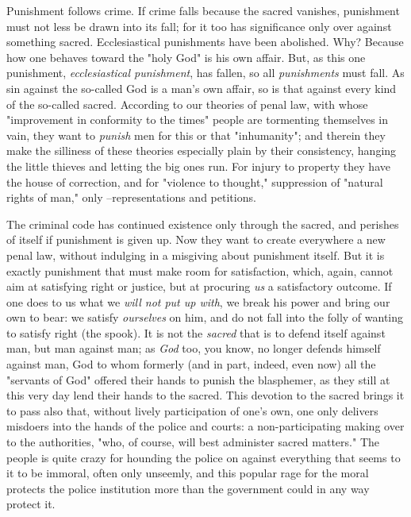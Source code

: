 \documentclass[a4paper]{book}
\begin{document}
Punishment follows crime. If crime falls because the sacred vanishes, 
punishment must not less be drawn into its fall; for it too has significance 
only over against something sacred. Ecclesiastical punishments have been 
abolished. Why? Because how one behaves toward the "{}holy God"{} is his own 
affair. But, as this one punishment, \textit{ecclesiastical punishment}, has 
fallen, so all \textit{punishments} must fall. As sin against the so-called 
God is a man's own affair, so is that against every kind of the so-called 
sacred. According to our theories of penal law, with whose "{}improvement in 
conformity to the times"{} people are tormenting themselves in vain, they want 
to \textit{punish} men for this or that "{}inhumanity"{}; and therein they 
make the silliness of these theories especially plain by their consistency, 
hanging the little thieves and letting the big ones run. For injury to 
property they have the house of correction, and for "{}violence to thought,"{} 
suppression of "{}natural rights of man,"{} only --representations and 
petitions.

The criminal code has continued existence only through the sacred, and 
perishes of itself if punishment is given up. Now they want to create 
everywhere a new penal law, without indulging in a misgiving about punishment 
itself. But it is exactly punishment that must make room for satisfaction, 
which, again, cannot aim at satisfying right or justice, but at procuring 
\textit{us} a satisfactory outcome. If one does to us what we \textit{will not 
put up with}, we break his power and bring our own to bear: we satisfy 
\textit{ourselves} on him, and do not fall into the folly of wanting to 
satisfy right (the spook). It is not the \textit{sacred} that is to defend 
itself against man, but man against man; as \textit{God} too, you know, no 
longer defends himself against man, God to whom formerly (and in part, indeed, 
even now) all the "{}servants of God"{} offered their hands to punish the 
blasphemer, as they still at this very day lend their hands to the sacred. 
This devotion to the sacred brings it to pass also that, without lively 
participation of one's own, one only delivers misdoers into the hands of the 
police and courts: a non-participating making over to the authorities, "{}who, 
of course, will best administer sacred matters."{} The people is quite crazy 
for hounding the police on against everything that seems to it to be immoral, 
often only unseemly, and this popular rage for the moral protects the police 
institution more than the government could in any way protect it.
\end{document}
